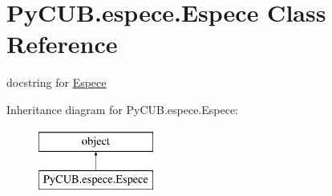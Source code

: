 \hypertarget{class_py_c_u_b_1_1espece_1_1_espece}{}\section{Py\+C\+U\+B.\+espece.\+Espece Class Reference}
\label{class_py_c_u_b_1_1espece_1_1_espece}


docstring for \mbox{\hyperlink{class_py_c_u_b_1_1espece_1_1_espece}{Espece}}  


Inheritance diagram for Py\+C\+U\+B.\+espece.\+Espece\+:\begin{figure}[H]
\begin{center}
\leavevmode
\includegraphics[height=2.000000cm]{class_py_c_u_b_1_1espece_1_1_espece}
\end{center}
\end{figure}
